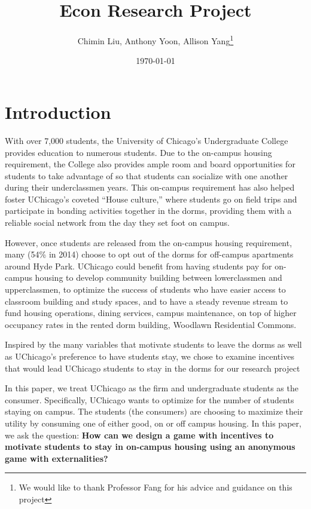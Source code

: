 \documentclass[12pt]{article}
\title{Econ Research Project}
\author{Chimin Liu, Anthony Yoon, Allison Yang\thanks{We would like to thank Professor Fang for his advice and guidance on this project}}
\date{\today}
\begin{document}
\maketitle
\tableofcontents
\newpage
\section{Introduction}
With over 7,000 students, the University of Chicago’s Undergraduate College provides education to numerous students. Due to the on-campus housing requirement, the College also provides ample room and board opportunities for students to take advantage of so that students can socialize with one another during their underclassmen years. This on-campus requirement has also helped foster UChicago’s coveted “House culture,” where students go on field trips and participate in bonding activities together in the dorms, providing them with a reliable social network from the day they set foot on campus.


However, once students are released from the on-campus housing requirement, many (54\% in 2014) choose to opt out of the dorms for off-campus apartments around Hyde Park. UChicago could benefit from having students pay for on-campus housing to develop community building between lowerclassmen and upperclassmen, to optimize the success of students who have easier access to classroom building and study spaces, and to have a steady revenue stream to fund housing operations, dining services, campus maintenance, on top of higher occupancy rates in the rented dorm building, Woodlawn Residential Commons. 


Inspired by the many variables that motivate students to leave the dorms as well as UChicago’s preference to have students stay, we chose to examine incentives that would lead UChicago students to stay in the dorms for our research project


In this paper, we treat UChicago as the firm and undergraduate students as the consumer. Specifically, UChicago wants to optimize for the number of students staying on campus. The students (the consumers) are choosing to maximize their utility by consuming one of either good, on or off campus housing. In this paper, we ask the question: \textbf{How can we design a game with incentives to motivate students to stay in on-campus housing using an anonymous game with externalities?}
\end{document}
